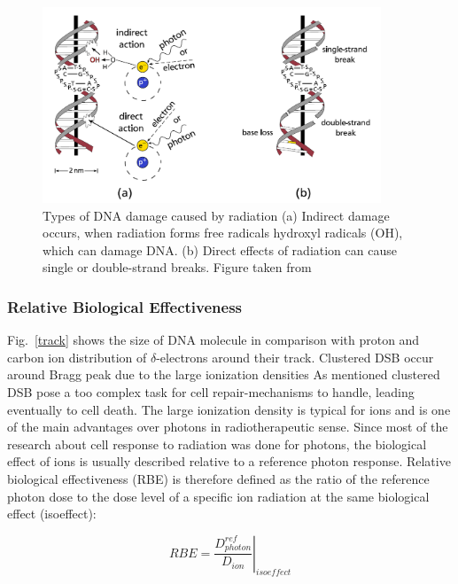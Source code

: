 \documentclass[type=dr, dr=rernat, accentcolor=tud7b,colorbacktitle, bigchapter, openright, twoside, 12pt ]{tudthesis}
\begin{document}
\begin{figure}[H]
\begin{center}
\includegraphics[width=0.9\textwidth]{./Images/SSB_DSB.png}
\caption{Types of DNA damage caused by radiation (a) Indirect damage occurs, when radiation forms free radicals hydroxyl radicals (OH), which can damage DNA. (b) Direct effects of radiation can cause single or double-strand breaks. 
Figure taken from \cite{Richter2012}}
\label{ida}
\end{center}
\end{figure}


\subsubsection{Relative Biological Effectiveness}
\label{RBE}

Fig.~\ref{track} shows the size of DNA molecule in comparison with proton and carbon ion distribution of $\delta$-electrons around their track. Clustered DSB occur around Bragg peak due to the large ionization densities As mentioned
clustered DSB pose a too complex task for cell repair-mechanisms to handle, leading eventually to cell death. The large ionization density is typical for ions and is one of the main advantages over photons in radiotherapeutic sense. Since most of the research about
cell response to radiation was done for photons, the biological effect of ions is usually described relative to a reference photon response. Relative biological effectiveness (RBE) is therefore defined as the ratio of the reference 
photon dose to the dose level of a specific ion radiation at the same biological effect (isoeffect):

\begin{equation}
 RBE = \left.\frac{D^{ref}_{photon}}{D_{ion}} \right|_{isoeffect}
\end{equation}
\end{document}
